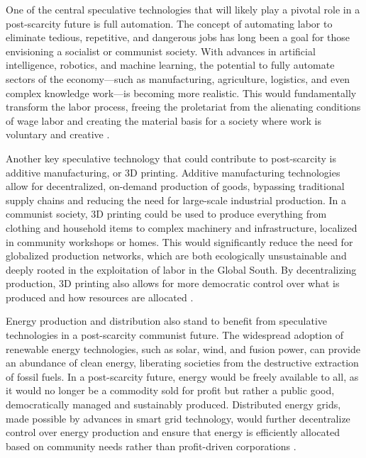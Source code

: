 \begin{refsection}
One of the central speculative technologies that will likely play a pivotal role in a post-scarcity future is full automation. The concept of automating labor to eliminate tedious, repetitive, and dangerous jobs has long been a goal for those envisioning a socialist or communist society. With advances in artificial intelligence, robotics, and machine learning, the potential to fully automate sectors of the economy—such as manufacturing, agriculture, logistics, and even complex knowledge work—is becoming more realistic. This would fundamentally transform the labor process, freeing the proletariat from the alienating conditions of wage labor and creating the material basis for a society where work is voluntary and creative \cite[pp.~215-217]{cockshott1993}.

Another key speculative technology that could contribute to post-scarcity is additive manufacturing, or 3D printing. Additive manufacturing technologies allow for decentralized, on-demand production of goods, bypassing traditional supply chains and reducing the need for large-scale industrial production. In a communist society, 3D printing could be used to produce everything from clothing and household items to complex machinery and infrastructure, localized in community workshops or homes. This would significantly reduce the need for globalized production networks, which are both ecologically unsustainable and deeply rooted in the exploitation of labor in the Global South. By decentralizing production, 3D printing also allows for more democratic control over what is produced and how resources are allocated \cite[pp.~133-136]{bastani2019}.

Energy production and distribution also stand to benefit from speculative technologies in a post-scarcity communist future. The widespread adoption of renewable energy technologies, such as solar, wind, and fusion power, can provide an abundance of clean energy, liberating societies from the destructive extraction of fossil fuels. In a post-scarcity future, energy would be freely available to all, as it would no longer be a commodity sold for profit but rather a public good, democratically managed and sustainably produced. Distributed energy grids, made possible by advances in smart grid technology, would further decentralize control over energy production and ensure that energy is efficiently allocated based on community needs rather than profit-driven corporations \cite[pp.~174-176]{schwab2020}.


\end{refsection}

